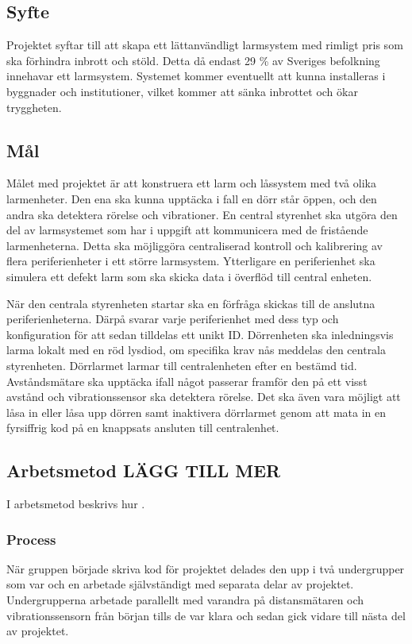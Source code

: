 \documentclass{article}
\begin{document}

\subsection{Syfte}
Projektet syftar till att skapa ett lättanvändligt larmsystem med rimligt pris som ska förhindra inbrott och stöld. Detta då endast 29 \% av Sveriges befolkning innehavar ett larmsystem.\cite{SSF} Systemet kommer eventuellt att kunna installeras i byggnader och institutioner, vilket kommer att sänka inbrottet och ökar tryggheten.


\subsection{Mål}
Målet med projektet är att konstruera ett larm och låssystem med två olika larmenheter. Den ena ska kunna upptäcka i fall en dörr står öppen, och den andra ska detektera rörelse och vibrationer. 
En central styrenhet ska utgöra den del av larmsystemet som har i uppgift att kommunicera med de fristående larmenheterna.
Detta ska möjliggöra centraliserad kontroll och kalibrering av flera periferienheter i ett större larmsystem.
Ytterligare en periferienhet ska simulera ett defekt larm som ska skicka data i överflöd till central enheten.

När den centrala styrenheten startar ska en förfråga skickas till de anslutna periferienheterna. Därpå svarar varje periferienhet med dess typ och konfiguration för att sedan tilldelas ett unikt ID. Dörrenheten ska inledningsvis larma lokalt med en röd lysdiod, om specifika krav nås meddelas den centrala styrenheten. Dörrlarmet larmar till centralenheten efter en bestämd tid. Avståndsmätare ska upptäcka ifall något passerar framför den på ett visst avstånd och vibrationssensor ska detektera rörelse. Det ska även vara möjligt att låsa in eller låsa upp dörren samt inaktivera dörrlarmet genom att mata in en fyrsiffrig kod på en knappsats ansluten till centralenhet.


\subsection{Arbetsmetod LÄGG TILL MER }
I arbetsmetod beskrivs hur .


\subsubsection{Process}
När gruppen började skriva kod för projektet delades den upp i två undergrupper som var och en arbetade självständigt med separata delar av projektet. 
Undergrupperna arbetade parallellt med varandra på distansmätaren och vibrationssensorn från början tills de var klara och sedan gick vidare till nästa del av projektet.
\end{document}
